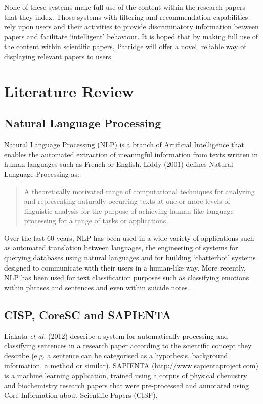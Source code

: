 None of these systems make full use of the content within the research papers
that they index. Those systems with filtering and recommendation capabilities
rely upon users and their activities to provide discriminatory information
between papers and facilitate `intelligent' behaviour. It is hoped that by
making full use of the content within scientific papers, Patridge will offer a
novel, reliable way of displaying relevant papers to users.

\section{ Literature Review}

\subsection{Natural Language Processing}

Natural Language Processing (NLP)  is a branch of Artificial Intelligence that
enables the automated extraction of meaningful information from texts written
in human languages such as French or English. Liddy (2001) defines Natural
Language Processing as:

\begin{quotation} 
A theoretically motivated range of computational techniques for analyzing and
representing naturally occurring texts at one or more levels of linguistic
analysis for the purpose of achieving human-like language processing for a
range of tasks or applications \cite{liddy2001natural}.  
\end{quotation}

Over the last 60 years, NLP has been used in a wide variety of applications
such as automated translation between languages\cite{hutchins2004first}, the
engineering of systems for querying databases using natural languages
\cite{rao2010natural} and for building `chatterbot' systems designed to
communicate with their users in a human-like way\cite{Alfonsi2006}.
More recently, NLP has been used for text classification purposes such as
classifying emotions within phrases and sentences \cite{Wilson05Polarity} and
even within suicide notes \cite{citeulike:11077287}.


\subsection{CISP, CoreSC and SAPIENTA}

Liakata \emph{et al.} (2012) describe a system for automatically processing and
classifying sentences in a research paper according to the scientific concept
they describe (e.g. a sentence can be categorised as a hypothesis, background
information, a method or similar)\cite{citeulike:10444769}. SAPIENTA
(\url{http://www.sapientaproject.com}) is a machine learning application,
trained using a corpus of physical chemistry and biochemistry research papers
that were pre-processed and annotated using Core Information about Scientific
Papers (CISP)\cite{LIAKATA10.644}. 

